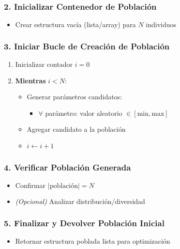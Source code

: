 \subsubsection*{2. Inicializar Contenedor de Población}
\begin{itemize}
    \item Crear estructura vacía (lista/array) para $N$ individuos
\end{itemize}

\subsubsection*{3. Iniciar Bucle de Creación de Población}
\begin{enumerate}[label= (\alph*)]
    \item Inicializar contador $i = 0$
    \item \textbf{Mientras} $i < N$:
    \begin{itemize}
        \item Generar parámetros candidatos:
        \begin{itemize}
            \item $\forall$ parámetro: valor aleatorio $\in [\text{min}, \text{max}]$
        \end{itemize}
        \item Agregar candidato a la población
        \item $i \leftarrow i + 1$
    \end{itemize}
\end{enumerate}

\subsubsection*{4. Verificar Población Generada}
\begin{itemize}
    \item Confirmar $|\text{población}| = N$
    \item \textit{(Opcional)} Analizar distribución/diversidad
\end{itemize}

\subsubsection*{5. Finalizar y Devolver Población Inicial}
\begin{itemize}
    \item Retornar estructura poblada lista para optimización
\end{itemize}

